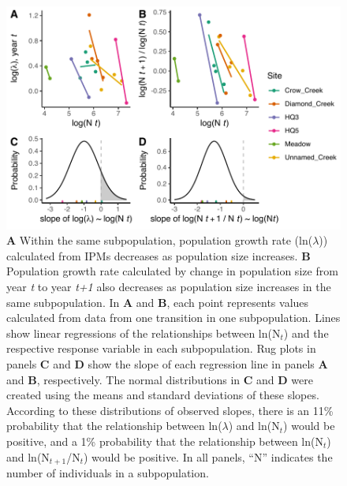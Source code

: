 \documentclass[12pt, letterpaper]{article}
\begin{document}
\begin{figure}[h]
  \centering
  \includegraphics[width=.8\textwidth]{figures/densityDependenceFigure.pdf}
  \caption{\textbf{A} Within the same subpopulation, population growth rate (ln($\lambda$)) calculated from IPMs decreases as population size increases. \textbf{B} Population growth rate calculated by change in population size from year \textit{t} to year \textit{t+1} also decreases as population size increases in the same subpopulation. In \textbf{A} and \textbf{B}, each point represents values calculated from data from one transition in one subpopulation. Lines show linear regressions of the relationships between ln(N$_t$) and the respective response variable in each subpopulation. Rug plots in panels \textbf{C} and \textbf{D} show the slope of each regression line in panels \textbf{A} and \textbf{B}, respectively. The normal distributions in \textbf{C} and \textbf{D} were created using the means and standard deviations of these slopes. According to these distributions of observed slopes, there is an 11\% probability that the relationship between ln($\lambda$) and ln(N$_t$) would be positive, and a 1\% probability that the relationship between ln(N$_t$) and ln(N$_{t+1}$/N$_t$) would be positive. In all panels, “N” indicates the number of individuals in a subpopulation. }
  \label{fig:DDFig}
\end{figure} 
\end{document}
